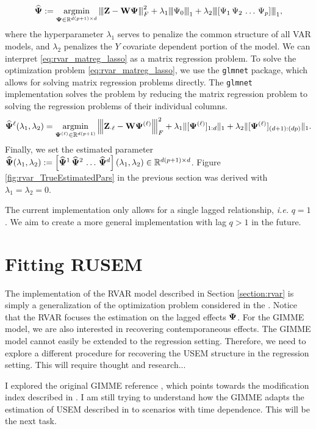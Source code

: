\begin{equation}\label{eq:rvar_matreg_lasso}
	\widehat{\bm{\Psi}} := \mathop{\mathrm{argmin}}_{\bm{\Psi}\in \mathbb{R}^{d (p+1) \times d}} {\left\vert\kern-0.25ex\left\vert\kern-0.25ex\left\vert  \mathbf{Z} - \mathbf{W} \bm{\Psi}  \right\vert\kern-0.25ex\right\vert\kern-0.25ex\right\vert}_{F}^2 + \lambda_1 {\left\vert\kern-0.25ex\left\vert\kern-0.25ex\left\vert \Psi_{0} \right\vert\kern-0.25ex\right\vert\kern-0.25ex\right\vert}_1 +  \lambda_2 {\left\vert\kern-0.25ex\left\vert\kern-0.25ex\left\vert [\Psi_1 \, \Psi_2 \, \ldots \, \Psi_p] \right\vert\kern-0.25ex\right\vert\kern-0.25ex\right\vert}_1,
\end{equation}
where the hyperparameter $\lambda_1$ serves to penalize the common structure of all VAR models, and $\lambda_2$ penalizes the $Y$ covariate dependent portion of the model. We can interpret \eqref{eq:rvar_matreg_lasso} as a matrix regression problem. To solve the optimization problem \eqref{eq:rvar_matreg_lasso}, we use the \texttt{glmnet} package, which allows for solving matrix regression problems directly. The \texttt{glmnet} implementation  solves the problem by reducing the matrix regression problem to solving the regression problems of their individual columns.  
\begin{equation*}
	\widehat{\bm{\Psi}}^{\ell}(\lambda_1,\lambda_2) = \mathop{\mathrm{argmin}}_{\bm{\Psi}^{(\ell)} \in \mathbb{R}^{d (p+1)}} {\left\vert\kern-0.25ex\left\vert\kern-0.25ex\left\vert  \mathbf{Z}_{\cdot \ell} - \mathbf{W} \bm{\Psi}^{(\ell)}  \right\vert\kern-0.25ex\right\vert\kern-0.25ex\right\vert}_{F}^2 + \lambda_1 \|{[\bm{\Psi}^{(\ell)}]_{1:d}}\|_1 +  \lambda_2 \|{[\bm{\Psi}^{(\ell)}]_{(d+1):(dp)}}\|_1.
\end{equation*}
Finally, we set the estimated parameter $\widehat{\bm{\Psi}}(\lambda_1,\lambda_2) := \left[\widehat{\bm{\Psi}}^{1}\, \widehat{\bm{\Psi}}^{2}\,\ldots \, \widehat{\bm{\Psi}}^{d}\right](\lambda_1,\lambda_2)\in\mathbb{R}^{d(p+1)\times d}$. Figure \ref{fig:rvar_TrueEstimatedPars} in the previous section was derived with $\lambda_1 = \lambda_2 = 0$.

The current implementation only allows for a single lagged relationship, \textit{i.e.} $q = 1$. We aim to create a more general implementation with lag $q> 1$ in the future.

\section{Fitting RUSEM}


The implementation of the RVAR model described in Section \ref{section:rvar} is simply a generalization of the optimization problem considered in the \citet{fisher2022penalized}. Notice that the RVAR focuses the estimation on the lagged effects $\bm{\Psi}$. For the GIMME model, we are also interested in recovering contemporaneous effects. The GIMME model cannot easily be extended to the regression setting. Therefore, we need to explore a different procedure for recovering the USEM structure in the regression setting. This will require thought and research...

I explored the original GIMME reference \citet{gates2012group}, which points towards the modification index described in \citet{sorbom1989model}. I am still trying to understand how the GIMME adapts the estimation of USEM described in \citet{sorbom1989model} to scenarios with time dependence. This will be the next task.





